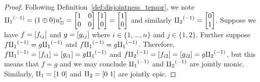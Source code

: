 \begin{proof}
  Following Definition~\ref{def:disjointness_tensor}, we note ${\amalg_{1}}^{(-1)} = (1\oplus0)u_{\oplus}^r =
  \begin{bmatrix}
    1&0\\0&0
  \end{bmatrix}
  \begin{bmatrix}
    1\\0
  \end{bmatrix}  =
  \begin{bmatrix}
    1\\0
  \end{bmatrix}
  $ and similarly ${\amalg_{2}}^{(-1)} =
  \begin{bmatrix}
    0\\1
  \end{bmatrix}$. Suppose we have $f = [f_{ij}]$ and $g = [g_{ij}]$ where
  $i \in \{1,\ldots,n\}$ and $j\in\{1,2\}$. Further suppose $f{\amalg_{1}}^{(-1)} = g{\amalg_{1}}^{(-1)}$ and $f{\amalg_{1}}^{(-1)} = g{\amalg_{1}}^{(-1)}$.
  Therefore, $f {\amalg_{1}}^{(-1)} = [f_{i 1}] = [g_{i 1}] = g{\amalg_{1}}^{(-1)}$ and
  $f {\amalg_{2}}^{(-1)} = [f_{i 2}] = [g_{i 2}] = g{\amalg_{2}}^{(-1)}$, but this means that $f = g$ and we may conclude
  ${\amalg_{1}}^{(-1)}$ and ${\amalg_{2}}^{(-1)}$ are jointly monic. Similarly, $\amalg_{1} = [1\ 0]$ and $\amalg_{2} = [0\ 1]$ are
  jointly epic.
\end{proof}

